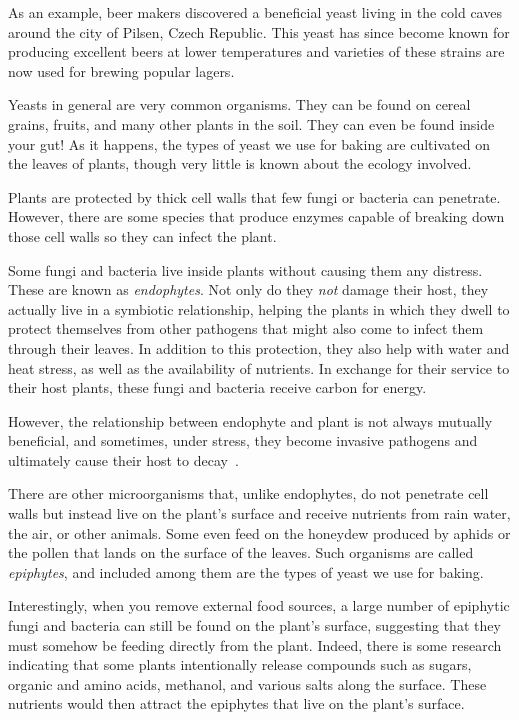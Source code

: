 As an example, beer makers discovered a beneficial yeast living in the cold
caves around the city of Pilsen, Czech Republic. This yeast has since become
known for producing excellent beers at lower temperatures and varieties of
these strains are now used for brewing popular lagers.

Yeasts in general are very common organisms. They can be found on cereal
grains, fruits, and many other plants in the soil. They can even be found
inside your gut! As it happens, the types of yeast we use for baking are
cultivated on the leaves of plants, though very little is known about the
ecology involved.

Plants are protected by thick cell walls that few fungi or bacteria can
penetrate. However, there are some species that produce enzymes capable of
breaking down those cell walls so they can infect the plant.

Some fungi and bacteria live inside plants without causing them any distress.
These are known as \emph{endophytes}. Not only do they \emph{not} damage their
host, they actually live in a symbiotic relationship, helping the plants in
which they dwell to protect themselves from other pathogens that might also
come to infect them through their leaves. In addition to this protection, they
also help with water and heat stress, as well as the availability of nutrients.
In exchange for their service to their host plants, these fungi and bacteria
receive carbon for energy.

However, the relationship between endophyte and plant is not always mutually
beneficial, and sometimes, under stress, they become invasive pathogens and
ultimately cause their host to decay~\cite{endophytes+in+plants}.

There are other microorganisms that, unlike endophytes, do not penetrate cell
walls but instead live on the plant's surface and receive nutrients from rain
water, the air, or other animals. Some even feed on the honeydew produced by
aphids or the pollen that lands on the surface of the leaves. Such organisms
are called \emph{epiphytes}, and included among them are the types of yeast
we use for baking.

Interestingly, when you remove external food sources, a large number of
epiphytic fungi and bacteria can still be found on the plant's surface,
suggesting that they must somehow be feeding directly from the plant.
Indeed, there is some research indicating that some plants intentionally release
compounds such as sugars, organic and amino acids, methanol, and various
salts along the surface. These nutrients would then attract the epiphytes that
live on the plant's surface.


